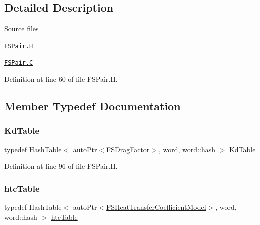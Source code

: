 \subsection{Detailed Description}
\begin{DoxyParagraph}{Source files}

\begin{DoxyItemize}
\item \href{../../../home/carlo/data/GeN-Foam/GeN-Foam_ffn/GeN-Foam/GeN-Foam/classes/thermalHydraulics/src/physicsModels/phasePairs/FSPair.H}{\tt F\+S\+Pair.\+H} 
\item \href{../../../home/carlo/data/GeN-Foam/GeN-Foam_ffn/GeN-Foam/GeN-Foam/classes/thermalHydraulics/src/physicsModels/phasePairs/FSPair.C}{\tt F\+S\+Pair.\+C} 
\end{DoxyItemize}
\end{DoxyParagraph}


Definition at line 60 of file F\+S\+Pair.\+H.



\subsection{Member Typedef Documentation}
\mbox{\label{classFoam_1_1FSPair_a9fff7443e03586fe1171f2b48bf43ac0}} 
\subsubsection{\texorpdfstring{Kd\+Table}{KdTable}}
{\footnotesize\ttfamily typedef Hash\+Table$<$ auto\+Ptr$<$\hyperlink{classFoam_1_1FSDragFactor}{F\+S\+Drag\+Factor}$>$, word, word\+::hash $>$ \hyperlink{classFoam_1_1FSPair_a9fff7443e03586fe1171f2b48bf43ac0}{Kd\+Table}\hspace{0.3cm}{\ttfamily [protected]}}



Definition at line 96 of file F\+S\+Pair.\+H.

\mbox{\label{classFoam_1_1FSPair_afcdf367b12288044e3559dd3b09ea5d3}} 
\subsubsection{\texorpdfstring{htc\+Table}{htcTable}}
{\footnotesize\ttfamily typedef Hash\+Table$<$ auto\+Ptr$<$\hyperlink{classFoam_1_1FSHeatTransferCoefficientModel}{F\+S\+Heat\+Transfer\+Coefficient\+Model}$>$, word, word\+::hash $>$ \hyperlink{classFoam_1_1FSPair_afcdf367b12288044e3559dd3b09ea5d3}{htc\+Table}\hspace{0.3cm}{\ttfamily [protected]}}



